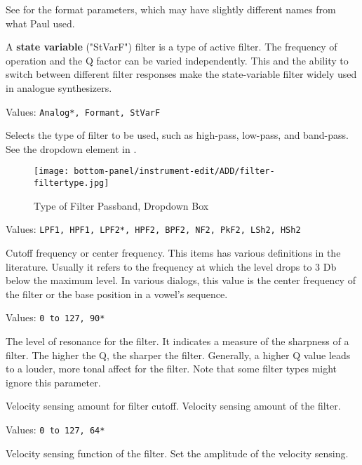    See  for the format parameters,
   which may have slightly different names from what Paul used.

   A \textbf{state variable} ("StVarF") filter
   is a type of active filter.
   The frequency of operation and the Q factor can be varied independently.
   This and the ability to switch between different filter responses make the
   state-variable filter widely used in analogue synthesizers.

   Values: \texttt{Analog*, Formant, StVarF}

   Selects the type of filter to be used, such as high-pass, low-pass,
   and band-pass.
   See the dropdown element in .

\begin{figure}[H]
   \centering
   \texttt{[image: bottom-panel/instrument-edit/ADD/filter-filtertype.jpg]}
   \caption[Filter Type Dropdown]{Type of Filter Passband, Dropdown Box}
   \label{fig:filter_type_dropdown}
\end{figure}

   Values: \texttt{LPF1, HPF1, LPF2*, HPF2, BPF2, NF2, PkF2, LSh2, HSh2}

   Cutoff frequency or center frequency.
   This items has various definitions in the literature.
   Usually it refers to the frequency at which the level
   drops to 3 Db below the maximum level.
   In various dialogs, this value is the
   center frequency of the filter or the base position in
   a vowel's sequence.

   Values: \texttt{0 to 127, 90*}

   The level of resonance for the filter.
   It indicates a measure of the sharpness of a filter.
   The higher the Q, the sharper the filter.
   Generally, a higher Q value leads to a louder, more tonal
   affect for the filter.
   Note that some filter types might ignore this parameter.

   Velocity sensing amount for filter cutoff.
   Velocity sensing amount of the filter.

   Values: \texttt{0 to 127, 64*}

   Velocity sensing function of the filter.
   Set the amplitude of the velocity sensing.

